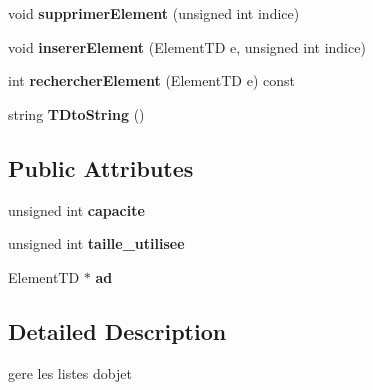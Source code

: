 \begin{DoxyCompactItemize}
\item 
void {\bfseries supprimer\+Element} (unsigned int indice)\hypertarget{classTableauDynamique_a8d012c0963adcf88a9415ad68e31c9d0}{}\label{classTableauDynamique_a8d012c0963adcf88a9415ad68e31c9d0}

\item 
void {\bfseries inserer\+Element} (Element\+TD e, unsigned int indice)\hypertarget{classTableauDynamique_a0aa8c67bde21e2f67ab7f9fbba9211b5}{}\label{classTableauDynamique_a0aa8c67bde21e2f67ab7f9fbba9211b5}

\item 
int {\bfseries rechercher\+Element} (Element\+TD e) const \hypertarget{classTableauDynamique_ae7cf571e629b5b9f3d962e6d75851dab}{}\label{classTableauDynamique_ae7cf571e629b5b9f3d962e6d75851dab}

\item 
string {\bfseries T\+Dto\+String} ()\hypertarget{classTableauDynamique_a3bb6dd075074509464fe581f46364c09}{}\label{classTableauDynamique_a3bb6dd075074509464fe581f46364c09}

\end{DoxyCompactItemize}
\subsection*{Public Attributes}
\begin{DoxyCompactItemize}
\item 
unsigned int {\bfseries capacite}\hypertarget{classTableauDynamique_a7ddd455f3dc2f3d94093177025945936}{}\label{classTableauDynamique_a7ddd455f3dc2f3d94093177025945936}

\item 
unsigned int {\bfseries taille\+\_\+utilisee}\hypertarget{classTableauDynamique_ae55063c3127e7ee9390e572fb0ed3a58}{}\label{classTableauDynamique_ae55063c3127e7ee9390e572fb0ed3a58}

\item 
Element\+TD $\ast$ {\bfseries ad}\hypertarget{classTableauDynamique_a5d63738b63b1aaabf4e1ab8a7d705032}{}\label{classTableauDynamique_a5d63738b63b1aaabf4e1ab8a7d705032}

\end{DoxyCompactItemize}


\subsection{Detailed Description}
gere les listes d\textquotesingle{}objet 


